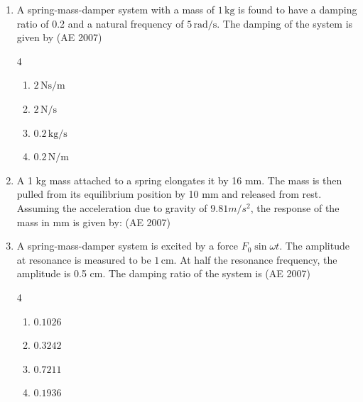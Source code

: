 \begin{enumerate}[label=\thesubsection.\arabic*,ref=\thesubsection.\theenumi]
    \item A spring-mass-damper system with a mass of $1 \, \mathrm{kg}$ is found to have a damping ratio of 0.2 and a natural frequency of $5 \, \mathrm{rad/s}$. The damping of the system is given by 
	    \hfill (AE 2007)
    \begin{multicols}{4}
    \begin{enumerate}
        \item $2 \, \mathrm{Ns/m}$ 
        \item $2 \, \mathrm{N/s}$ 
        \item $0.2 \, \mathrm{kg/s}$ 
        \item $0.2 \, \mathrm{N/m}$
    \end{enumerate}
    \end{multicols}
    \item A 1 kg mass attached to a spring elongates it by 16 mm. The mass is then pulled from its equilibrium position by 10 mm and released from rest. Assuming the acceleration due to gravity of $9.81 m/s^2$, the response of the mass in mm is given by: 
    \hfill (AE 2007)
\begin{enumerate}
    \end{enumerate}
    \item A spring-mass-damper system is excited by a force $F_0 \sin \omega t$. The amplitude at resonance is measured to be $1 \, \mathrm{cm}$. At half the resonance frequency, the amplitude is 0.5 cm. The damping ratio of the system is 
    \hfill (AE 2007)
    \begin{multicols}{4}
\begin{enumerate}
        \item $0.1026$ \quad
        \item $0.3242$ \quad
        \item $0.7211$ \quad
        \item $0.1936$
    \end{enumerate}
    \end{multicols}


\end{enumerate}
